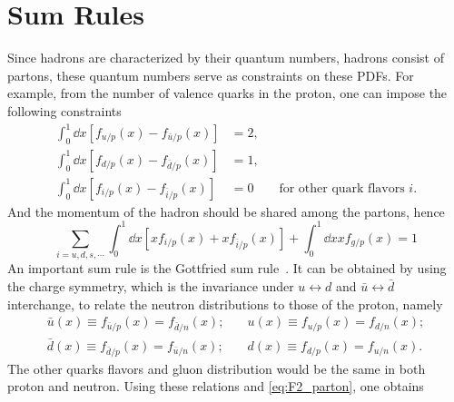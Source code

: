 \documentclass[../main.tex]{subfiles}
\begin{document}
\section{Sum Rules}
\label{sec:sum_rules}
Since hadrons are characterized by their quantum numbers, hadrons consist of partons,
these quantum numbers serve as constraints on these PDFs.
For example, from the number of valence quarks in the proton,
one can impose the following constraints
\begin{equation}
	\begin{split}
		\int_{0}^{1} \dd{x} \left[f_{u/p} \left(x\right)-f_{\bar{u}/p} \left(x\right)\right] & =2,                                          \\
		\int_{0}^{1} \dd{x} \left[f_{d/p} \left(x\right)-f_{\bar{d}/p} \left(x\right)\right] & =1,                                          \\
		\int_{0}^{1} \dd{x} \left[f_{i/p} \left(x\right)-f_{\bar{i}/p} \left(x\right)\right] & =0 \qquad \text{for other quark flavors } i.
	\end{split}
\end{equation}
And the momentum of the hadron should be shared among the partons, hence
\begin{equation}
	\sum_{i=u,d,s,\cdots} \int_{0}^{1}\dd{x}\left[x f_{i/p}\left(x\right) +x f_{\bar{i}/p}\left(x\right) \right] + \int_{0}^{1}\dd{x} x f_{g/p}\left(x\right)=1
\end{equation}
An important sum rule is the Gottfried sum rule~\cite{gottfried1967}. It can be obtained
by using the charge symmetry,
which is the invariance under $u\leftrightarrow d$ and $\bar{u}\leftrightarrow \bar{d}$ interchange,
to relate the neutron distributions to those of
the proton, namely
\begin{equation}
	\begin{split}
		\bar{u}(x) \equiv f_{\bar{u}/p}(x) = f_{\bar{d}/n}(x); & \quad u(x) \equiv f_{u/p}(x) = f_{d/n}(x); \\
		\bar{d}(x) \equiv f_{\bar{d}/p}(x) = f_{\bar{u}/n}(x); & \quad d(x) \equiv f_{d/p}(x) = f_{u/n}(x).
	\end{split}
\end{equation}
The other quarks flavors and gluon distribution would be the same in both proton and neutron.
Using these relations and \cref{eq:F2_parton}, one obtains
\end{document}
